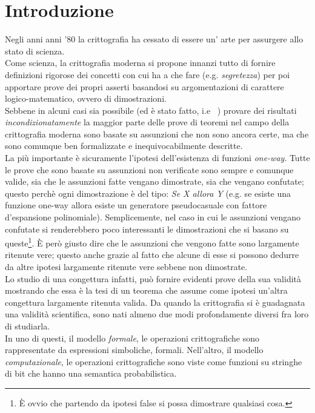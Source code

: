 \documentclass[a4paper,openright,twoside,12pt]{report}
\author{Gian Pietro Farina}
\begin{document}
\chapter*{Introduzione}
Negli anni anni '80 la crittografia ha cessato di essere un' arte per assurgere allo stato di scienza. \\Come scienza, la crittografia moderna
si propone innanzi tutto di fornire definizioni rigorose dei concetti con cui ha a che fare (e.g. \emph{segretezza}) per poi apportare prove dei propri asserti basandosi 
su argomentazioni di carattere logico-matematico, ovvero di dimostrazioni. \\
Sebbene in alcuni casi sia possibile (ed \`e stato fatto, i.e ~\cite{Shannon}) provare dei risultati \emph{incondizionatamente} la maggior parte delle prove di teoremi nel campo 
della crittografia moderna sono basate su assunzioni che non sono ancora certe, ma che sono comunque ben formalizzate e inequivocabilmente descritte.\\La pi\`u importante \`e sicuramente
l'ipotesi dell'esistenza di funzioni \emph{one-way}. Tutte le prove che sono basate su assunzioni non verificate sono sempre e comunque valide, sia che le assunzioni fatte vengano dimostrate,
sia che vengano confutate; questo perch\`e ogni dimostrazione \`e del tipo: \emph{Se X allora Y} (e.g. se esiste una funzione one-way allora esiste un generatore pseudocasuale con fattore
d'espansione polinomiale). Semplicemente, nel caso in cui le assunzioni vengano confutate si renderebbero poco interessanti le dimostrazioni che si basano su queste\footnote{\`E ovvio che partendo da ipotesi false si possa
dimostrare qualsiasi cosa.}.
\`E per\`o giusto dire che le assunzioni che vengono fatte sono largamente ritenute vere; questo anche  grazie al fatto che alcune di esse si possono dedurre da altre ipotesi 
largamente ritenute vere sebbene non dimostrate.\\Lo studio di una congettura infatti, pu\`o fornire evidenti prove della sua validit\`a mostrando che essa \`e la tesi di un teorema che assume come ipotesi
un'altra congettura largamente ritenuta valida.
Da quando la crittografia si \`e guadagnata una validit\`a scientifica, sono nati almeno due modi profondamente diversi fra loro di
studiarla.\\In uno di questi, il modello \emph{formale}, le operazioni crittografiche sono rappresentate da espressioni simboliche, formali.
Nell'altro, il modello \emph{computazionale}, le operazioni crittografiche sono viste come funzioni su stringhe di bit che hanno una semantica probabilistica.
\end{document}

